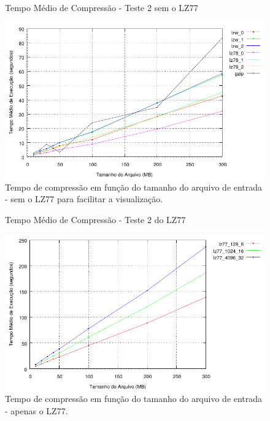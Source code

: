 \documentclass[]{article}
\begin{document}
\begin{figure}
	{\centering Tempo Médio de Compressão - Teste 2 sem o LZ77\par}
	\includegraphics{images/binario_tempo_sem_lz77}
\caption{Tempo de compressão em função do tamanho do arquivo de entrada - sem o LZ77 para facilitar a visualização.}
\label{fig:e5}
\end{figure}

\begin{figure}
	{\centering Tempo Médio de Compressão - Teste 2 do LZ77\par}
	\includegraphics{images/binario_tempo_com_lz77}
\caption{Tempo de compressão em função do tamanho do arquivo de entrada - apenas o LZ77.}
\label{fig:e6}
\end{figure}
\end{document}
